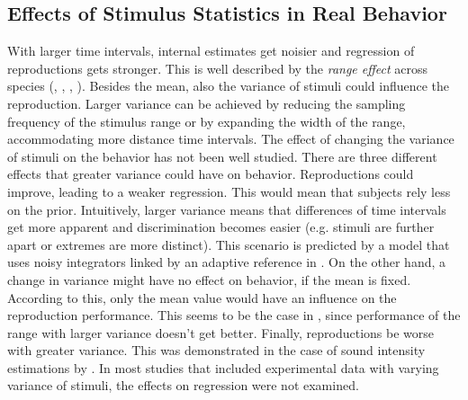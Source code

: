 \documentclass[10pt]{article}
\begin{document}
\subsection{Effects of Stimulus Statistics in Real Behavior}
With larger time intervals, internal estimates get noisier and regression of reproductions gets stronger. This is well described by the \textit{range effect} across species (\cite{Cicchini2012}, \cite{Henke2021}, \cite{Henke2022}, \cite{Sohn2019}). 
Besides the mean, also the variance of stimuli could influence the reproduction.
Larger variance can be achieved by reducing the sampling frequency of the stimulus range or by expanding the width of the range, accommodating more distance time intervals. 
The effect of changing the variance of stimuli on the behavior has not been well studied.
There are three different effects that greater variance could have on behavior. 
Reproductions could improve, leading to a weaker regression. This would mean that subjects rely less on the prior. 
Intuitively, larger variance means that differences of time intervals get more apparent and discrimination becomes easier (e.g. stimuli are further apart or extremes are more distinct). 
This scenario is predicted by a model that uses noisy integrators linked by an adaptive reference in \cite{Thurley2016}.
On the other hand, a change in variance might have no effect on behavior, if the mean is fixed. According to this, only the mean value would have an influence on the reproduction performance.
This seems to be the case in \cite{Petzschner2012}, since performance of the range with larger variance doesn't get better. 
Finally, reproductions be worse with greater variance. This was demonstrated in the case of sound intensity estimations by \cite{Teghtsoonian78}.
In most studies that included experimental data with varying variance of stimuli, the effects on regression were not examined. 
\end{document}
